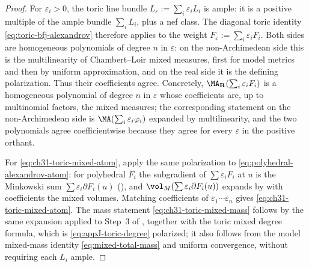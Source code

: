 \begin{proof}
For $\varepsilon_i>0$, the toric line bundle
$L_\varepsilon:=\sum_i\varepsilon_iL_i$ is ample: it is a positive
multiple of the ample bundle $\sum_iL_i$, plus a nef class.  The diagonal
toric identity \eqref{eq:toric-bfj-alexandrov} therefore applies to the
weight $F_\varepsilon:=\sum_i\varepsilon_iF_i$.  Both sides are
homogeneous polynomials of degree $n$ in $\varepsilon$: on the
non-Archimedean side this is the multilinearity of Chambert--Loir mixed
measures, first for model metrics and then by uniform approximation, and on
the real side it is the defining polarization.  Thus their coefficients
agree.  Concretely,
$\MA_{\mathbf R}(\sum_i\varepsilon_iF_i)$ is a homogeneous polynomial of
degree $n$ in $\varepsilon$ whose coefficients are, up to multinomial
factors, the mixed measures; the corresponding statement on the
non-Archimedean side is $\MA(\sum_i\varepsilon_i\varphi_i)$ expanded by
multilinearity, and the two polynomials agree coefficientwise because they
agree for every $\varepsilon$ in the positive orthant.

For \eqref{eq:ch31-toric-mixed-atom}, apply the same polarization to
\eqref{eq:polyhedral-alexandrov-atom}: for polyhedral $F_i$ the
subgradient of $\sum\varepsilon_iF_i$ at $u$ is the Minkowski sum
$\sum\varepsilon_i\partial F_i(u)$ (), and
$\vol_M(\sum\varepsilon_i\partial F_i(u))$ expands by
 with coefficients the mixed volumes.
Matching coefficients of $\varepsilon_1\cdots\varepsilon_n$ gives
\eqref{eq:ch31-toric-mixed-atom}.  The mass statement
\eqref{eq:ch31-toric-mixed-mass} follows by the same expansion applied to
Step~3 of , together with the toric mixed
degree formula, which is \eqref{eq:appJ-toric-degree} polarized; it also
follows from the model mixed-mass identity \eqref{eq:mixed-total-mass}
and uniform convergence, without requiring each $L_i$ ample.
\end{proof}

